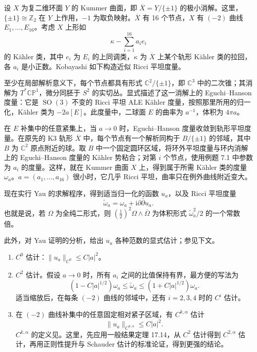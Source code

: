 \begin{example}\label{ex:7.22}
设 $X$ 为复二维环面 $Y$ 的 Kummer 曲面，即 $\overline X=Y/\{\pm1\}$ 的极小消解。这里，$\{\pm1\}\cong\mathbb Z_2$ 在 $Y$ 上作用，$-1$ 为取负映射。$\overline X$ 有 16 个节点，$X$ 有 $(-2)$ 曲线 $E_1,\ldots,E_{16}$。考虑 $X$ 上形如
\[
\kappa-\sum_{i=1}^{16}a_ie_i
\]
的 Kähler 类，其中 $e_i$ 为 $E_i$ 的上同调类，$\kappa$ 为 $\overline X$ 上某个轨形 Kähler 类的拉回，各 $a_i$ 是小正数。Kobayashi 如下构造近似 Ricci 平坦度量。

至少在局部解析意义下，每个节点都具有形式 $\mathbb C^2/\{\pm1\}$，即 $\mathbb C^3$ 中的二次锥；其消解为 $T^*\mathbb{CP}^1$，微分同胚于 $S^2$ 的实切丛。显式描述了这一消解上的 Eguchi--Hanson 度量：它是 $\operatorname{SO}(3)$ 不变的 Ricci 平坦 ALE Kähler 度量，按照那里所用的归一化，Kähler 类为 $-2a[E]$。此度量中，二球面 $E$ 的曲率为 $a^{-1}$，体积为 $4\pi a$。

在 $E$ 补集中的任意紧集上，当 $a\to0$ 时，Eguchi--Hanson 度量收敛到轨形平坦度量。在原先的 K3 轨形 $\overline X$ 中，每个节点有一个解析同构于 $B/\{\pm1\}$ 的邻域，其中 $B$ 为 $\mathbb C^2$ 原点附近的球。取 $B$ 中一个固定圆环区域，将环外平坦度量与环内消解上的 Eguchi--Hanson 度量的 Kähler 势粘合；对第 $i$ 个节点，使用例题 7.1 中参数为 $a_i$ 的度量。这样，就在 Kummer 曲面 $X$ 上，得到属于所需 Kähler 类的度量 $\omega_a$。$a=(a_1,\ldots,a_{16})$ 很小时，它几乎 Ricci 平坦，曲率只在例外曲线附近变大。

现在实行 Yau 的求解程序，得到适当归一化的函数 $u_a$，以及 Ricci 平坦度量
\[
\widetilde\omega_a=\omega_a+\mathrm i\partial\bar\partial u_a.
\]
也就是说，若 $\Omega$ 为全纯二形式，则 $(\tfrac{\mathrm i}2)^2\Omega\wedge\overline\Omega$ 为体积形式 $\widetilde\omega_a^2/2$ 的一个常数倍。

此外，对 Yau 证明的分析，给出 $u_a$ 各种范数的显式估计；参见下文。
\begin{enumerate}[label=\textup{(\Roman*)}]
\item $C^0$ 估计：$\|u_a\|_{C^0}\leq C|a|^2$。
\item $C^2$ 估计。假设 $a\to0$ 时，所有 $a_i$ 之间的比值保持有界，最方便的写法为
\[
(1-C|a|^{1/2})\omega_a\leq\widetilde\omega_a
\leq(1+C|a|^{1/2})\omega_a.
\]
适当缩放后，在每条 $(-2)$ 曲线的邻域中，还有 $i=2,3,4$ 时的 $C^i$ 估计。
\item 在 $(-2)$ 曲线补集中的任意固定相对紧子区域，有 $C^{k,\alpha}$ 估计
\[
\|u_a\|_{C^{k,\alpha}}\leq C|a|^2.
\]
$C^{k,\alpha}$ 的定义见。这里，先应用一般结果定理 17.14，从 $C^2$ 估计得到 $C^{2,\alpha}$ 估计，再用正则性提升与 Schauder 估计的标准论证，得到更强的结论。
\end{enumerate}
\end{example}

